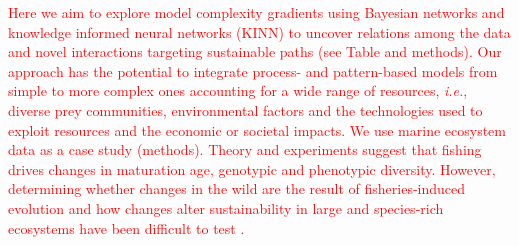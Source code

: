 \documentclass[12pt,a4paper]{article}
\begin{document}
\textcolor{red}{Here we aim to explore model complexity gradients using Bayesian networks and knowledge informed neural networks (KINN) to uncover relations among the data and novel interactions targeting sustainable paths (see Table and methods). Our approach has the potential to integrate process- and pattern-based models from simple to more complex ones accounting for a wide range of resources, {\it i.e.}, diverse prey communities, environmental factors and the technologies used to exploit resources and the economic or societal impacts. We use marine ecosystem data as a case study (methods). Theory and experiments suggest that fishing drives changes in maturation age, genotypic and phenotypic diversity. However, determining whether changes in the wild are the result of fisheries-induced evolution and how changes alter sustainability in large and species-rich ecosystems have been difficult to test \cite {Pinskye2025453118}.}
\end{document}
